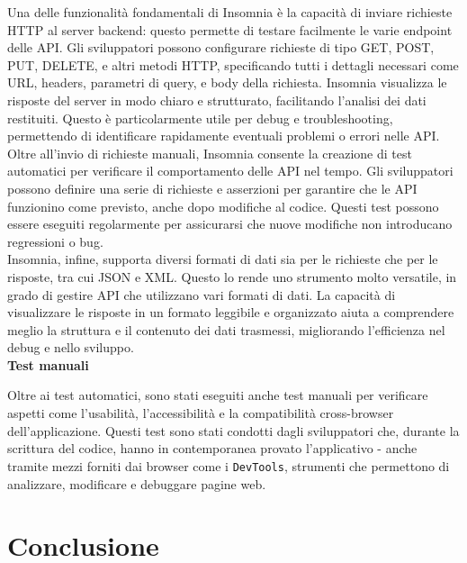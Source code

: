 \documentclass[a4paper, 12pt]{book}
\begin{document}
Una delle funzionalità fondamentali di Insomnia è la capacità di inviare richieste HTTP al server backend: questo permette di testare
facilmente le varie endpoint delle API. Gli sviluppatori possono configurare richieste di tipo GET, POST, PUT, DELETE, e altri metodi HTTP,
specificando tutti i dettagli necessari come URL, headers, parametri di query, e body della richiesta. Insomnia visualizza le risposte del server
in modo chiaro e strutturato, facilitando l'analisi dei dati restituiti. Questo è particolarmente utile per debug e troubleshooting, permettendo
di identificare rapidamente eventuali problemi o errori nelle API.\\

Oltre all'invio di richieste manuali, Insomnia consente la creazione di test automatici per verificare il comportamento delle API nel tempo.
Gli sviluppatori possono definire una serie di richieste e asserzioni per garantire che le API funzionino come previsto, anche dopo modifiche al codice.
Questi test possono essere eseguiti regolarmente per assicurarsi che nuove modifiche non introducano regressioni o bug.\\

Insomnia, infine, supporta diversi formati di dati sia per le richieste che per le risposte, tra cui JSON e XML. Questo lo rende uno strumento
molto versatile, in grado di gestire API che utilizzano vari formati di dati. La capacità di visualizzare le risposte in un formato leggibile e
organizzato aiuta a comprendere meglio la struttura e il contenuto dei dati trasmessi, migliorando l'efficienza nel debug e nello sviluppo.\\

\textbf{Test manuali}

Oltre ai test automatici, sono stati eseguiti anche test manuali per verificare aspetti come l'usabilità, l'accessibilità e la
compatibilità cross-browser dell'applicazione. Questi test sono stati condotti dagli sviluppatori che, durante la scrittura del
codice, hanno in contemporanea provato l'applicativo - anche tramite mezzi forniti dai browser come
i \texttt{DevTools}, strumenti che permettono di analizzare, modificare e debuggare pagine web.




\chapter{Conclusione}
\end{document}
